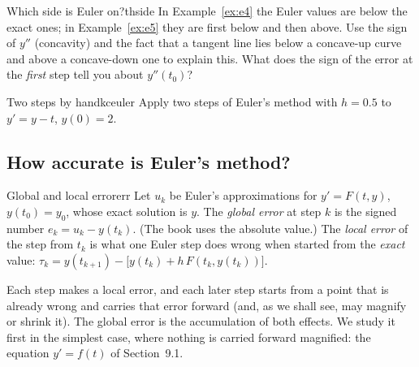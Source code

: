 \documentclass[11pt]{article}
\begin{document}
\begin{think}{Which side is Euler on?}{thside}
In Example~\ref{ex:e4} the Euler values are below the exact ones; in Example~\ref{ex:e5} they are first below and then above. Use the sign of $y''$ (concavity) and the fact that a tangent line lies below a concave-up curve and above a concave-down one to explain this. What does the sign of the error at the \emph{first} step tell you about $y''(t_0)$?
\end{think}

\begin{kc}{Two steps by hand}{kceuler}
Apply two steps of Euler's method with $h=0.5$ to $y'=y-t$, $y(0)=2$.
\end{kc}

\subsection*{How accurate is Euler's method?}

\begin{defn}{Global and local error}{err}
Let $u_k$ be Euler's approximations for $y'=F(t,y)$, $y(t_0)=y_0$, whose exact solution is $y$. The \emph{global error} at step $k$ is the signed number $e_k=u_k-y(t_k)$. (The book uses the absolute value.) The \emph{local error} of the step from $t_k$ is what one Euler step does wrong when started from the \emph{exact} value: $\tau_k=y(t_{k+1})-\big[y(t_k)+h\,F(t_k,y(t_k))\big]$.
\end{defn}

Each step makes a local error, and each later step starts from a point that is already wrong and carries that error forward (and, as we shall see, may magnify or shrink it). The global error is the accumulation of both effects. We study it first in the simplest case, where nothing is carried forward magnified: the equation $y'=f(t)$ of Section~9.1.
\end{document}
